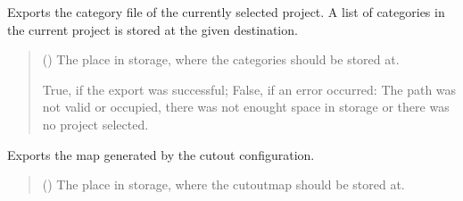 \documentclass[letterpaper,10pt,english]{sphinxmanual}
\begin{document}
\begin{fulllineitems}
\begin{fulllineitems}
\label{\detokenize{apidoc/src.osm_configurator.control:src.osm_configurator.control.export_controller.ExportController.export_configurations}}
\pysigstartsignatures
{}
\pysigstopsignatures
\sphinxAtStartPar
Exports the category file of the currently selected project.
A list of categories in the current project is stored at the given destination.
\begin{quote}\begin{description}
\sphinxAtStartPar
{} () \textendash{} The place in storage, where the categories should be stored at.

\sphinxAtStartPar
True, if the export was successful; False, if an error occurred: The path was not valid or occupied, there was not enought space in storage or there was no project selected.

\sphinxAtStartPar
{}

\end{description}\end{quote}

\end{fulllineitems}


\begin{fulllineitems}
\label{\detokenize{apidoc/src.osm_configurator.control:src.osm_configurator.control.export_controller.ExportController.export_cut_out_map}}
\pysigstartsignatures
{}
\pysigstopsignatures
\sphinxAtStartPar
Exports the map generated by the cut\sphinxhyphen{}out configuration.
\begin{quote}\begin{description}
\sphinxAtStartPar
{} () \textendash{} The place in storage, where the cut\sphinxhyphen{}out\sphinxhyphen{}map should be stored at.


\end{description}
\end{quote}
\end{fulllineitems}
\end{fulllineitems}
\end{document}
